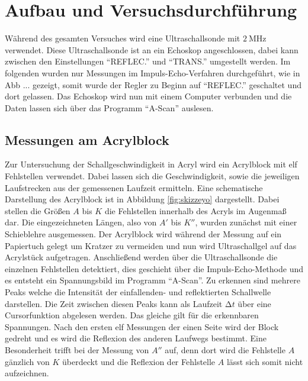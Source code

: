 \section{Aufbau und Versuchsdurchführung}

Während des gesamten Versuches wird eine Ultraschallsonde mit $\SI{2}{\mega\hertz}$ verwendet. Diese Ultraschallsonde ist an ein Echoskop angeschlossen, dabei kann zwischen den Einstellungen
\enquote{REFLEC.} und \enquote{TRANS.} umgestellt werden. Im folgenden wurden nur Messungen im Impuls-Echo-Verfahren durchgeführt, wie in Abb ... gezeigt, somit wurde der Regler zu Beginn auf \enquote{REFLEC.}
geschaltet und dort gelassen. Das Echoskop wird nun mit einem Computer verbunden und die Daten lassen sich über das Programm \enquote{A-Scan} auslesen.

\subsection{Messungen am Acrylblock}

Zur Untersuchung der Schallgeschwindigkeit in Acryl wird ein Acrylblock mit elf Fehlstellen verwendet. Dabei lassen sich die Geschwindigkeit, sowie die jeweiligen Laufstrecken aus der gemessenen Laufzeit ermitteln. Eine schematische Darstellung 
des Acrylblock ist in Abbildung \ref{fig:skizzeyo} dargestellt. Dabei stellen die Größen $A$ bis $K$ die Fehlstellen innerhalb des Acryls im Augenmaß dar. Die eingezeichneten Längen, also von $A'$ bis $K''$, wurden zunächst mit einer Schieblehre ausgemessen. Der Acrylblock wird während der Messung auf ein Papiertuch gelegt um Kratzer zu vermeiden und 
nun wird Ultraschallgel auf das Acrylstück aufgetragen. Anschließend werden über die Ultraschallsonde die einzelnen Fehlstellen detektiert, dies geschieht über die Impuls-Echo-Methode und es entsteht ein Spannungsbild im Programm \enquote{A-Scan}. Zu erkennen sind mehrere Peaks welche die Intensität der einfallenden- und reflektierten Schallwelle darstellen.
Die Zeit zwischen diesen Peaks kann als Laufzeit $\increment t$ über eine Cursorfunktion abgelesen werden. Das gleiche gilt für die erkennbaren Spannungen. Nach den ersten elf Messungen der einen Seite wird der Block gedreht und es wird die 
Reflexion des anderen Laufwegs bestimmt. Eine Besonderheit trifft bei der Messung von $A''$ auf, denn dort wird die Fehlstelle $A$ gänzlich von $K$ überdeckt und die Reflexion der Fehlstelle $A$ lässt sich somit nicht aufzeichnen.

